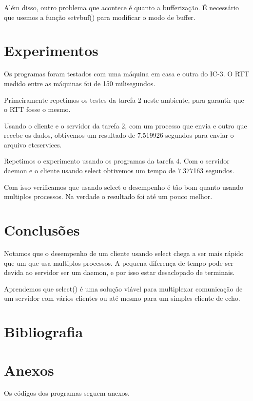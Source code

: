 \documentclass[12pt,a4paper]{article}
\begin{document}
Além disso, outro problema que acontece é quanto a bufferização. É necessário que usemos a função setvbuf() para modificar o modo de buffer.

\section{Experimentos}

Os programas foram testados com uma máquina em casa e outra do IC-3. 
O RTT medido entre as máquinas foi de 150 milisegundos. 

Primeiramente repetimos os testes da tarefa 2 neste ambiente, para garantir que o RTT fosse o mesmo. 

Usando o cliente e o servidor da tarefa 2, com um processo que envia e outro que recebe os dados, obtivemos um resultado de 7.519926 segundos para enviar o arquivo \/etc\/services. 

Repetimos o experimento usando os programas da tarefa 4. Com o servidor daemon e o cliente usando select obtivemos um tempo de 7.377163 segundos. 

Com isso verificamos que usando select o desempenho é tão bom quanto usando multiplos processos. Na verdade o resultado foi até um pouco melhor.


\section{Conclusões}

Notamos que o desempenho de um cliente usando select chega a ser mais rápido que um que usa multiplos processos. A pequena diferença de tempo pode ser devida ao servidor ser um daemon, e por isso estar desaclopado de terminais. 

Aprendemos que select() é uma solução viável para multiplexar comunicação de um servidor com vários clientes ou até mesmo para um simples cliente de echo.

\section{Bibliografia}




\section{Anexos}

Os códigos dos programas seguem anexos.
\end{document}
